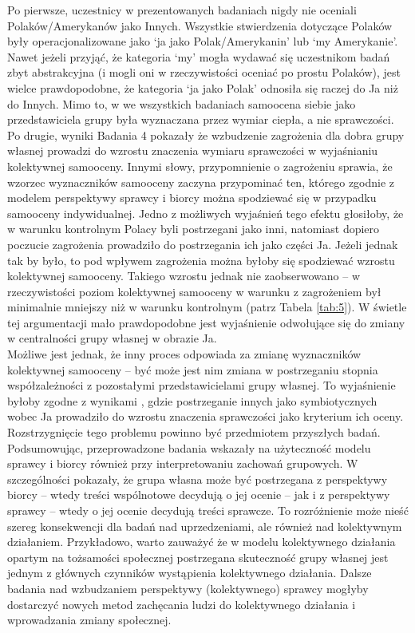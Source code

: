 \documentclass[man]{apa6}
\begin{document}
Po pierwsze, uczestnicy w prezentowanych badaniach nigdy nie oceniali Polaków/Amerykanów jako Innych. Wszystkie stwierdzenia dotyczące Polaków były operacjonalizowane jako `ja jako Polak/Amerykanin' lub `my Amerykanie'. Nawet jeżeli przyjąć, że kategoria `my' mogła wydawać się uczestnikom badań zbyt abstrakcyjna (i mogli oni w rzeczywistości oceniać po prostu Polaków), jest wielce prawdopodobne, że kategoria `ja jako Polak' odnosiła się raczej do Ja niż do Innych. Mimo to, w we wszystkich badaniach samoocena siebie jako przedstawiciela grupy była wyznaczana przez  wymiar ciepła, a nie sprawczości.\\

Po drugie, wyniki Badania 4 pokazały że wzbudzenie zagrożenia dla dobra grupy własnej prowadzi do wzrostu znaczenia wymiaru sprawczości w wyjaśnianiu kolektywnej samooceny. Innymi słowy, przypomnienie o zagrożeniu sprawia, że wzorzec wyznaczników samooceny zaczyna przypominać ten, którego zgodnie z modelem perspektywy sprawcy i biorcy można spodziewać się w przypadku samooceny indywidualnej. Jedno z możliwych wyjaśnień tego efektu głosiłoby, że w warunku kontrolnym Polacy byli postrzegani jako inni, natomiast dopiero poczucie zagrożenia prowadziło do postrzegania ich jako części Ja. Jeżeli jednak tak by było, to pod wpływem zagrożenia można byłoby się spodziewać wzrostu kolektywnej samooceny. Takiego wzrostu jednak nie zaobserwowano -- w rzeczywistości poziom kolektywnej samooceny w warunku z zagrożeniem był minimalnie mniejszy niż w warunku kontrolnym (patrz Tabela \ref{tab:5}). W świetle tej argumentacji mało prawdopodobne jest wyjaśnienie odwołujące się do zmiany w centralności grupy własnej w obrazie Ja.\\

Możliwe jest jednak, że inny proces odpowiada za zmianę wyznaczników kolektywnej samooceny -- być może jest nim zmiana w postrzeganiu stopnia współzależności z pozostałymi przedstawicielami grupy własnej. To wyjaśnienie byłoby zgodne z wynikami \textcite{wojciszke2008primacy}, gdzie postrzeganie innych jako symbiotycznych wobec Ja prowadziło do wzrostu znaczenia sprawczości jako kryterium ich oceny. Rozstrzygnięcie tego problemu powinno być przedmiotem przyszłych badań. \\

Podsumowując, przeprowadzone badania wskazały na użyteczność modelu sprawcy i biorcy również przy interpretowaniu zachowań grupowych. W szczególności pokazały, że grupa własna może być postrzegana z perspektywy biorcy -- wtedy treści wspólnotowe decydują o jej ocenie -- jak i z perspektywy sprawcy -- wtedy o jej ocenie decydują treści sprawcze. To rozróżnienie może nieść szereg konsekwencji dla badań nad uprzedzeniami, ale również nad kolektywnym działaniem. Przykładowo, warto zauważyć że w modelu kolektywnego działania opartym na tożsamości społecznej \parencite{van2008toward} postrzegana skuteczność grupy własnej jest jednym z głównych czynników wystąpienia kolektywnego działania. Dalsze badania nad wzbudzaniem perspektywy (kolektywnego) sprawcy mogłyby dostarczyć nowych metod zachęcania ludzi do kolektywnego działania i wprowadzania zmiany społecznej.\\
\end{document}
